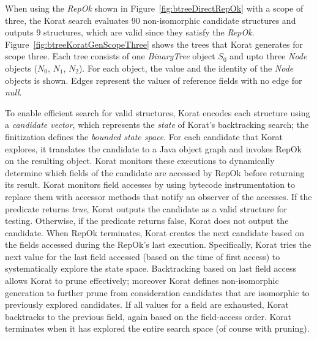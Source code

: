 \para When using the \emph{RepOk} shown in Figure~\ref{fig:btreeDirectRepOk} with a scope of three, the Korat search
evaluates 90 non-isomorphic candidate structures and outputs 9
structures, which are valid since they satisfy the \emph{RepOk}.
Figure~\ref{fig:btreeKoratGenScopeThree} shows the trees that Korat
generates for scope three. Each tree consists of one \emph{BinaryTree}
object $S_0$ and upto three \emph{Node} objects ($N_0$, $N_1$,
$N_2$). For each object, the value and the identity of the \emph{Node}
objects is shown. Edges represent the values of reference fields with
no edge for \emph{null}.


\para To enable efficient search for valid structures, Korat encodes
each structure using a \emph{candidate vector}, which represents the
\emph{state} of Korat's backtracking search; the finitization defines
the \emph{bounded state space}.  For each candidate that Korat
explores, it translates the candidate to a Java object graph and
invokes RepOk on the resulting object.  Korat monitors these
executions to dynamically determine which fields of the candidate are
accessed by RepOk before returning its result.  Korat monitors field
accesses by using bytecode instrumentation to replace them with
accessor methods that notify an observer of the accesses. If the
predicate returns \emph{true}, Korat outputs the candidate as a valid
structure for testing. Otherwise, if the predicate returns false,
Korat does not output the candidate.  When RepOk terminates, Korat
creates the next candidate based on the fields accessed during the
RepOk's last execution.  Specifically, Korat tries the next value for
the last field accessed (based on the time of first access) to
systematically explore the state space.  Backtracking based on last
field access allows Korat to prune effectively; moreover Korat defines
non-isomorphic generation to further prune from consideration
candidates that are isomorphic to previously explored candidates.  If
all values for a field are exhausted, Korat backtracks to the previous
field, again based on the field-access order.  Korat terminates when
it has explored the entire search space (of course with pruning).

